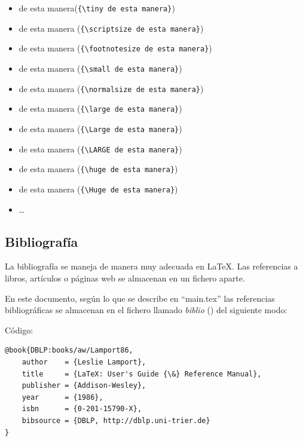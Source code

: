 \begin{itemize}
 \item {\tiny de esta manera}(\verb+{\tiny de esta manera}+)
 \item {\scriptsize de esta manera} (\verb+{\scriptsize de esta manera}+)
 \item {\footnotesize de esta manera} (\verb+{\footnotesize de esta manera}+)
 \item {\small de esta manera} (\verb+{\small de esta manera}+)
 \item {\normalsize de esta manera} (\verb+{\normalsize de esta manera}+)
 \item {\large de esta manera} (\verb+{\large de esta manera}+)
 \item {\Large de esta manera} (\verb+{\Large de esta manera}+)
 \item {\LARGE de esta manera} (\verb+{\LARGE de esta manera}+)
 \item {\huge de esta manera} (\verb+{\huge de esta manera}+)
 \item {\Huge de esta manera} (\verb+{\Huge de esta manera}+)
 \item \ldots 
\end{itemize}


\subsection{Bibliografía}
\label{subsecc:biblio}

La bibliografía se maneja de manera muy adecuada en \LaTeX{}. Las referencias a libros, artículos o páginas web se almacenan en un fichero aparte.

En este documento, según lo que se describe en ``main.tex'' las referencias bibliográficas se almacenan en el fichero llamado  \emph{biblio} (\verb++) del siguiente modo:
 
\vspace{0.25 cm}

Código:

\vspace{0.25 cm}

\begin{minipage}{8cm}
\begin{verbatim}
@book{DBLP:books/aw/Lamport86,
	author    = {Leslie Lamport},
	title     = {LaTeX: User's Guide {\&} Reference Manual},
	publisher = {Addison-Wesley},
	year      = {1986},
	isbn      = {0-201-15790-X},
	bibsource = {DBLP, http://dblp.uni-trier.de}
}
\end{verbatim}
\end{minipage}

